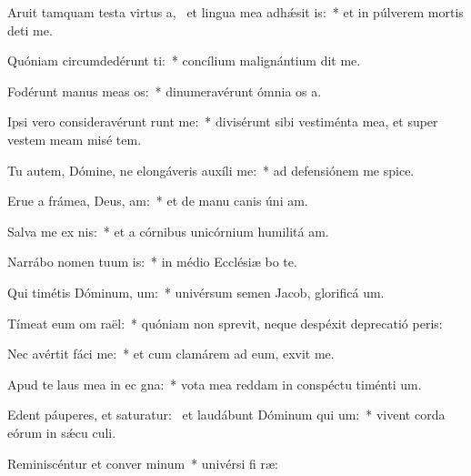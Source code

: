 \item Aruit tamquam testa virtus a,~\pscross{} et lingua mea adhǽsit  is:~* et in púlverem mortis deti me.
\item Quóniam circumdedérunt   ti:~* concílium malignántium dit me.
\item Fodérunt manus meas   os:~* dinumeravérunt ómnia os a.
\item Ipsi vero consideravérunt  runt me:~* divisérunt sibi vestiménta mea, et super vestem meam misé tem.
\item Tu autem, Dómine, ne elongáveris auxíli   me:~* ad defensiónem me spice.
\item Erue a frámea, Deus,  am:~* et de manu canis úni am.
\item Salva me ex  nis:~* et a córnibus unicórnium humilitá am.
\item Narrábo nomen tuum  is:~* in médio Ecclésiæ bo te.
\item Qui timétis Dóminum,  um:~* univérsum semen Jacob, glorificá um.
\item Tímeat eum om  raël:~* quóniam non sprevit, neque despéxit deprecatió peris:
\item Nec avértit fáci   me:~* et cum clamárem ad eum, exvit me.
\item Apud te laus mea in ec gna:~* vota mea reddam in conspéctu timénti um.
\item Edent páuperes, et saturatur:~\pscross{} et laudábunt Dóminum qui  um:~* vivent corda eórum in sǽcu culi.
\item Reminiscéntur et conver  minum~* univérsi fi ræ:
